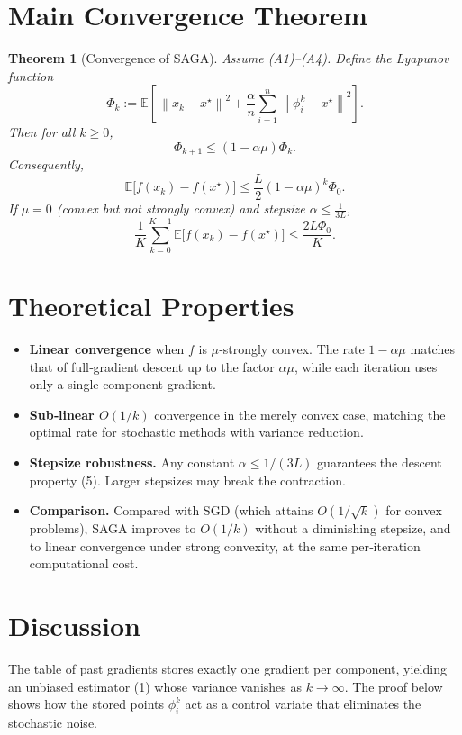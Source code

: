 \documentclass{article}
\newtheorem{theorem}{Theorem}
\newcommand{\E}{\mathbb{E}}
\newcommand{\norm}[1]{\left\|#1\right\|}
\begin{document}
\section*{Main Convergence Theorem}
\begin{theorem}[Convergence of SAGA]\label{thm:saga}
Assume (A1)–(A4). Define the Lyapunov function
\[
\Phi_k:=\E\!\left[\,\norm{x_k-x^\star}^2+\frac{\alpha}{n}\sum_{i=1}^{n}\norm{\phi_i^k-x^\star}^2\right].
\tag{4}
\]
Then for all $k\ge0$,
\[
\Phi_{k+1}\le\left(1-\alpha\mu\right)\Phi_k.
\tag{5}
\]
Consequently,
\[
\boxed{\E\!\big[f(x_k)-f(x^\star)\big]\le\frac{L}{2}\left(1-\alpha\mu\right)^k\Phi_0.}
\tag{6}
\]
If $\mu=0$ (convex but not strongly convex) and stepsize $\alpha\le\frac{1}{3L}$,
\[
\frac1K\sum_{k=0}^{K-1}\E\!\big[f(x_k)-f(x^\star)\big]\le\frac{2L\Phi_0}{K}.
\tag{7}
\]
\end{theorem}

\section*{Theoretical Properties}
\begin{itemize}
\item \textbf{Linear convergence} when $f$ is $\mu$‑strongly convex. The rate $1-\alpha\mu$ matches that of full‑gradient descent up to the factor $\alpha\mu$, while each iteration uses only a single component gradient.
\item \textbf{Sub‑linear $O(1/k)$} convergence in the merely convex case, matching the optimal rate for stochastic methods with variance reduction.
\item \textbf{Stepsize robustness.} Any constant $\alpha\le1/(3L)$ guarantees the descent property (5). Larger stepsizes may break the contraction.
\item \textbf{Comparison.} Compared with SGD (which attains $O(1/\sqrt{k})$ for convex problems), SAGA improves to $O(1/k)$ without a diminishing stepsize, and to linear convergence under strong convexity, at the same per‑iteration computational cost.
\end{itemize}

\section*{Discussion}
The table of past gradients stores exactly one gradient per component, yielding an unbiased estimator (1) whose variance vanishes as $k\to\infty$. The proof below shows how the stored points $\phi_i^k$ act as a control variate that eliminates the stochastic noise.
\end{document}
